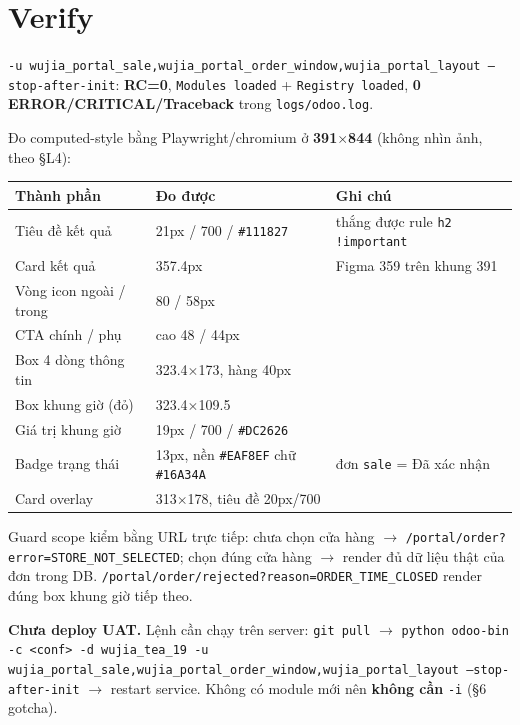 \section{Verify}

\texttt{-u wujia\_portal\_sale,wujia\_portal\_order\_window,wujia\_portal\_layout --stop-after-init}:
\textbf{RC=0}, \texttt{Modules loaded} + \texttt{Registry loaded}, \textbf{0 ERROR/CRITICAL/Traceback}
trong \texttt{logs/odoo.log}.

Đo computed-style bằng Playwright/chromium ở \textbf{391$\times$844} (không nhìn ảnh, theo §L4):

\begin{center}
\begin{tabular}{lll}
\hline
\textbf{Thành phần} & \textbf{Đo được} & \textbf{Ghi chú} \\
\hline
Tiêu đề kết quả & 21px / 700 / \texttt{\#111827} & thắng được rule \texttt{h2 !important} \\
Card kết quả & 357.4px & Figma 359 trên khung 391 \\
Vòng icon ngoài / trong & 80 / 58px & \\
CTA chính / phụ & cao 48 / 44px & \\
Box 4 dòng thông tin & 323.4$\times$173, hàng 40px & \\
Box khung giờ (đỏ) & 323.4$\times$109.5 & \\
Giá trị khung giờ & 19px / 700 / \texttt{\#DC2626} & \\
Badge trạng thái & 13px, nền \texttt{\#EAF8EF} chữ \texttt{\#16A34A} & đơn \texttt{sale} = Đã xác nhận \\
Card overlay & 313$\times$178, tiêu đề 20px/700 & \\
\hline
\end{tabular}
\end{center}

Guard scope kiểm bằng URL trực tiếp: chưa chọn cửa hàng $\to$
\texttt{/portal/order?error=STORE\_NOT\_SELECTED}; chọn đúng cửa hàng $\to$ render đủ dữ liệu thật
của đơn trong DB. \texttt{/portal/order/rejected?reason=ORDER\_TIME\_CLOSED} render đúng box khung
giờ tiếp theo.

\textbf{Chưa deploy UAT.} Lệnh cần chạy trên server:
\texttt{git pull} $\to$
\texttt{python odoo-bin -c <conf> -d wujia\_tea\_19 -u wujia\_portal\_sale,wujia\_portal\_order\_window,wujia\_portal\_layout --stop-after-init}
$\to$ restart service. Không có module mới nên \textbf{không cần} \texttt{-i} (§6 gotcha).
